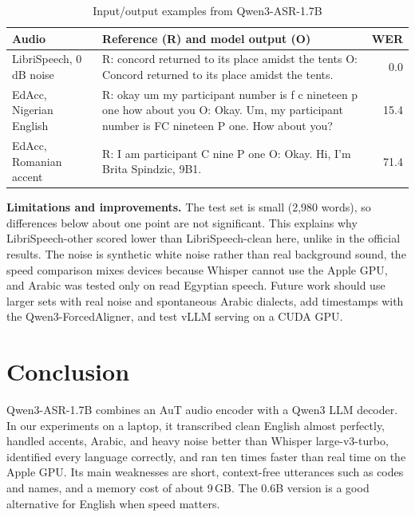 \documentclass[conference]{IEEEtran}
\begin{document}
\begin{table}[t]
\centering
\caption{Input/output examples from Qwen3-ASR-1.7B}
\label{tab:examples}
\setlength{\tabcolsep}{3pt}
\begin{tabular}{p{1.55cm}p{5.35cm}r}
\toprule
Audio & Reference (R) and model output (O) & WER \\
\midrule
LibriSpeech, 0\,dB noise & R: concord returned to its place amidst the tents \newline O: Concord returned to its place amidst the tents. & 0.0 \\
EdAcc, Nigerian English & R: okay um my participant number is f c nineteen p one how about you \newline O: Okay. Um, my participant number is FC nineteen P one. How about you? & 15.4 \\
EdAcc, Romanian accent & R: I am participant C nine P one \newline O: Okay. Hi, I'm Brita Spindzic, 9B1. & 71.4 \\
\bottomrule
\end{tabular}
\end{table}

\textbf{Limitations and improvements.} The test set is small (2,980 words), so differences below about one point are not significant. This explains why LibriSpeech-other scored lower than LibriSpeech-clean here, unlike in the official results. The noise is synthetic white noise rather than real background sound, the speed comparison mixes devices because Whisper cannot use the Apple GPU, and Arabic was tested only on read Egyptian speech. Future work should use larger sets with real noise and spontaneous Arabic dialects, add timestamps with the Qwen3-ForcedAligner, and test vLLM serving on a CUDA GPU.

\section{Conclusion}
Qwen3-ASR-1.7B combines an AuT audio encoder with a Qwen3 LLM decoder. In our experiments on a laptop, it transcribed clean English almost perfectly, handled accents, Arabic, and heavy noise better than Whisper large-v3-turbo, identified every language correctly, and ran ten times faster than real time on the Apple GPU. Its main weaknesses are short, context-free utterances such as codes and names, and a memory cost of about 9\,GB. The 0.6B version is a good alternative for English when speed matters.



\end{document}
